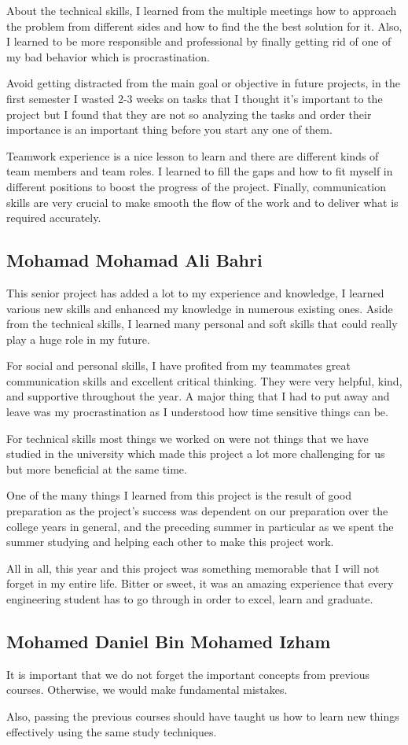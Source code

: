 \documentclass[../main.tex]{subfiles}
\begin{document}
About the technical skills, I learned from the multiple meetings how to 
approach the problem from different sides and how to find the 
the best solution for it. Also, I learned to be more responsible
and professional by finally getting rid of one of my bad behavior 
which is procrastination.

Avoid getting distracted from the main goal or objective in 
future projects, in the first semester I wasted 2-3 weeks 
on tasks that I thought it's important to the project but 
I found that they are not so analyzing the tasks and 
order their importance is an important thing before
you start any one of them.

Teamwork experience is a nice lesson to learn and 
there are different kinds of team members and team roles.
I learned to fill the gaps and how to fit myself in different 
positions to boost the progress of the project. 
Finally, communication skills are very crucial to make smooth 
the flow of the work and to deliver what is required accurately.

\subsection{Mohamad Mohamad Ali Bahri}
This senior project has added a lot to my experience and knowledge, I learned
various new skills and enhanced my knowledge in numerous existing ones. 
Aside from the technical skills, I learned many personal and soft skills that 
could really play a huge role in my future. 

For social and personal skills, I have profited from my teammates great 
communication skills and excellent critical thinking. They were very helpful, 
kind, and supportive throughout the year. A major thing that I had to put away
and leave was my procrastination as I understood how time sensitive things can
be. 

For technical skills most things we worked on were not things that we have 
studied in the university which made this project a lot more challenging for 
us but more beneficial at the same time. 

One of the many things I learned from this project is the result of good 
preparation as the project's success was dependent on our preparation over the 
college years in general, and the preceding summer in particular as we spent 
the summer studying and helping each other to make this project work.

All in all, this year and this project was something memorable that I will not 
forget in my entire life. Bitter or sweet, it was an amazing experience that 
every engineering student has to go through in order to excel, learn and 
graduate.

\subsection{Mohamed Daniel Bin Mohamed Izham}

It is important that we do not forget the important concepts from
previous courses.
Otherwise, we would make fundamental mistakes.

Also, passing the previous courses should have taught us how to learn
new things effectively using the same study techniques.
\end{document}
